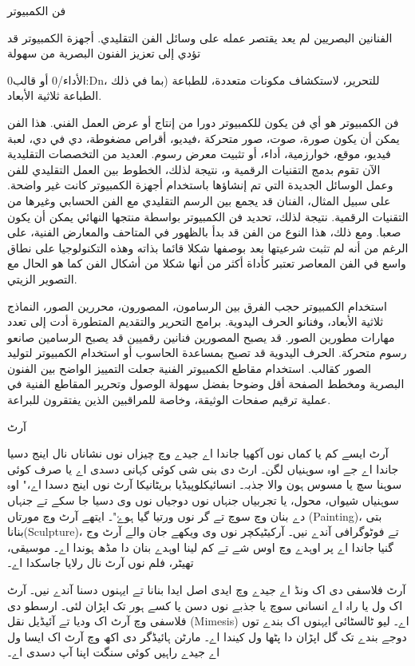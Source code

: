 \documentclass[a4paper]{article}
\begin{document}
\begin{flushright}
فن الكمبيوتر

الفنانين البصريين لم يعد يقتصر عمله على وسائل الفن التقليدي. أجهزة الكمبيوتر قد تؤدي إلى تعزيز الفنون البصرية من سهولة {0الأداء{/0} أو قالب:Dn، للتحرير، لاستكشاف مكونات متعددة، للطباعة (بما في ذلك الطباعة ثلاثية الأبعاد.

فن الكمبيوتر هو أي فن يكون للكمبيوتر دورا من إنتاج أو عرض العمل الفني. هذا الفن يمكن أن يكون صورة، صوت، صور متحركة ،فيديو، أقراص مضغوطة، دي في دي، لعبة فيديو، موقع، خوارزمية، أداء، أو تثبيت معرض رسوم. العديد من التخصصات التقليدية الآن تقوم بدمج التقنيات الرقمية و، نتيجة لذلك، الخطوط بين العمل التقليدي للفن وعمل الوسائل الجديدة التي تم إنشاؤها باستخدام أجهزة الكمبيوتر كانت غير واضحة. على سبيل المثال، الفنان قد يجمع بين الرسم التقليدي مع الفن الحسابي وغيرها من التقنيات الرقمية. نتيجة لذلك، تحديد فن الكمبيوتر بواسطة منتجها النهائي يمكن أن يكون صعبا. ومع ذلك، هذا النوع من الفن قد بدأ بالظهور في المتاحف والمعارض الفنية، على الرغم من أنه لم تثبت شرعيتها بعد بوصفها شكلا قائما بذاته وهذه التكنولوجيا على نطاق واسع في الفن المعاصر تعتبر كأداة أكثر من أنها شكلا من أشكال الفن كما هو الحال مع التصوير الزيتي.

استخدام الكمبيوتر حجب الفرق بين الرسامون، المصورون، محررين الصور، النماذج ثلاثية الأبعاد، وفنانو الحرف اليدوية. برامج التحرير والتقديم المتطورة أدت إلى تعدد مهارات مطورين الصور. قد يصبح المصورين فنانين رقميين قد يصبح الرسامين صانعو رسوم متحركة. الحرف اليدوية قد تصبح بمساعدة الحاسوب أو استخدام الكمبيوتر لتوليد الصور كقالب. استخدام مقاطع الكمبيوتر الفنية جعلت التمييز الواضح بين الفنون البصرية ومخطط الصفحة أقل وضوحا بفضل سهولة الوصول وتحرير المقاطع الفنية في عملية ترقيم صفحات الوثيقة، وخاصة للمراقبين الذين يفتقرون للبراعة.



آرٹ

آرٹ ایسے کم یا کماں نوں آکھیا جاندا اے جیدے وچ چیزاں نوں نشاناں نال اینج دسیا جاندا اے جے اوہ سوہنیاں لگن۔ ارٹ دی بنی شی کوئی کہانی دسدی اے یا صرف کوئی سوہنا سچ یا مسوس ہون والا جذبہ۔ انسائیکلوپیڈیا بریٹانیکا آرٹ نوں اینج دسدا اے،" اوہ سوہنیاں شیواں، محول، یا تجربیاں جنہاں نوں دوجیاں نوں وی دسیا جا سکے تے جنہاں دے بنان وچ سوچ تے گر نوں ورتیا گیا ہوۓ"۔ ایتھے آرٹ وچ مورتاں (Painting)، بتی بنانا(Sculpture)، تے فوٹوگرافی آندے نیں۔ آرکیٹیکچر نوں وی ویکھے جان والے آرٹ وج گنیا جاندا اے پر اوہدے وچ اوس شے تے کم لینا اوہدے بنان دا مڈھ ہوندا اے۔ موسیقی، تھیٹر، فلم نوں آرٹ نال رلایا جاسکدا اے۔

آرٹ فلاسفی دی اک ونڈ اے جیدے وچ ایدی اصل ایدا بنانا تے ایہنوں دسنا آندے نیں۔ آرٹ اک ول یا راہ اے انسانی سوچ یا جذبے نوں دسن یا کسے ہور تک اپڑان لئی۔ ارسطو دی فلاسفی وچ آرٹ اک ودیا تے آئیڈیل نقل (Mimesis) اے۔ لیو ٹالسٹائی ایہنوں اک بندے توں دوجے بندے تک گل اپڑان دا پٹھا ول کیندا اے۔ مارٹن ہائیڈگر دی اکھ وچ آرٹ اک ایسا ول اے جیدے راہیں کوئی سنگت اپنا آپ دسدی اے۔



}
\end{flushright}
\end{document}
